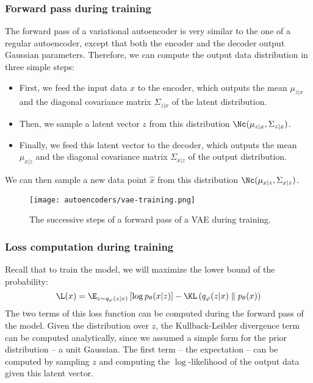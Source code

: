 \subsubsection{Forward pass during training}
The forward pass of a variational autoencoder is very similar to the one of a regular autoencoder, except that both the encoder and the decoder output Gaussian parameters. Therefore, we can compute the output data distribution in three simple steps:
\begin{itemize}
    \item First, we feed the input data $x$ to the encoder, which outputs the mean $\mu_{z|x}$ and the diagonal covariance matrix $\Sigma_{z|x}$ of the latent distribution. 
    \item Then, we sample a latent vector $z$ from this distribution $\Nc(\mu_{z|x}, \Sigma_{z|x})$. 
    \item Finally, we feed this latent vector to the decoder, which outputs the mean $\mu_{x|z}$ and the diagonal covariance matrix $\Sigma_{x|z}$ of the output distribution.
\end{itemize}
We can then sample a new data point $\hat{x}$ from this distribution $\Nc(\mu_{x|z}, \Sigma_{x|z})$.
\begin{figure}[H]
    \centering
    \texttt{[image: autoencoders/vae-training.png]}
    \caption{The successive steps of a forward pass of a VAE during training.}
\end{figure}


\subsubsection{Loss computation during training}
Recall that to train the model, we will maximize the lower bound of the probability:
\begin{equation*}
    \L(x) = \E_{z\sim q_\varphi(z|x)}\left[\log p_\theta(x|z)\right] - \KL\left(q_\varphi(z|x)\parallel p_\theta(x)\right)
\end{equation*}
The two terms of this loss function can be computed during the forward pass of the model. Given the distribution over $z$, the Kullback-Leibler divergence term can be computed analytically, since we assumed a simple form for the prior distribution -- a unit Gaussian. The first term -- the expectation -- can be computed by sampling $z$ and computing the $\log$-likelihood of the output data given this latent vector.

